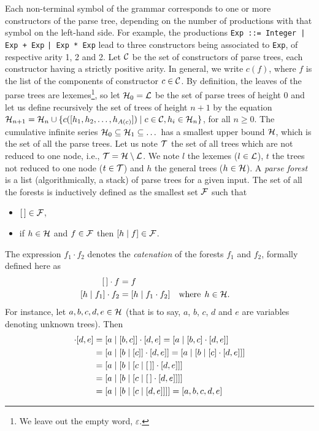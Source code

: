 Each non\hyp{}terminal symbol of the grammar corresponds to one or
more constructors of the parse tree, depending on the number of
productions with that symbol on the left\hyp{}hand side. For example,
the productions \verb/Exp ::= Integer | Exp + Exp/ \verb/| Exp * Exp/
lead to three constructors being associated to \verb|Exp|, of
respective arity 1, 2 and 2. Let \({\cal C}\) be the set of
constructors of parse trees, each constructor having a strictly
positive arity. In general, we write \(c(f)\), where \(f\) is the list
of the components of constructor \(c \in {\cal C}\). By definition,
the leaves of the parse trees are lexemes\footnote{We leave out the
  empty word, \(\varepsilon\).}, so let \({\cal H}_0 = {\cal L}\) be
the set of parse trees of height \(0\) and let us define recursively
the set of trees of height \(n+1\) by the equation \({\cal H}_{n+1} =
{\cal H}_n \cup \{c([h_1, h_2, \dots, h_{A(c)}]) \mid c \in {\cal C},
h_i \in {\cal H}_n\}\), for all \(n \geqslant 0\). The cumulative
infinite series \({\cal H}_0 \subseteq {\cal H}_1 \subseteq \dots\)
has a smallest upper bound \(\cal H\), which is the set of all the
parse trees. Let us note \(\cal T\) the set of all trees which are not
reduced to one node, i.e., \({\cal T} = {\cal H} \setminus {\cal
  L}\). We note \(l\) the lexemes (\(l \in {\cal L}\)), \(t\) the
trees not reduced to one node (\(t \in {\cal T}\)) and \(h\) the
general trees (\(h \in {\cal H}\)). A \emph{parse forest} is a list
(algorithmically, a stack) of parse trees for a given input. The set
of all the forests is inductively defined as the smallest set \(\cal
F\) such that
\begin{itemize}

  \item \([\,] \in {\cal F}\),

  \item if \(h \in {\cal H}\) and \(f \in {\cal F}\) then
    \([{h}\mid{f}] \in {\cal F}\).

\end{itemize}
The expression \(f_1 \cdot f_2\) denotes the \emph{catenation} of the
forests \(f_1\) and \(f_2\), formally defined here as
\begin{align}
  \el \cdot f &= f \label{model:conc:1}\\
  \cons{h}{f_1} \cdot f_2 &= \cons{h}{f_1 \cdot f_2}
  && \text{where} \;\, h \in {\cal H}. \label{model:conc:2}
\end{align}
For instance, let \(a, b, c, d, e \in {\cal H}\) (that is to say,
\(a\), \(b\), \(c\), \(d\) and \(e\) are variables denoting unknown
trees). Then
\begin{align*}
[a,b,c] \cdot [d,e] &= \cons{a}{[b,c]} \cdot [d,e] = \cons{a}{[b,c]
  \cdot [d,e]}\\
 &= \cons{a}{\cons{b}{[c]} \cdot [d,e]} = \cons{a}{\cons{b}{[c] \cdot
    [d,e]}}\\
 &= \cons{a}{\cons{b}{\cons{c}{\el} \cdot [d,e]}}\\
 &= \cons{a}{\cons{b}{\cons{c}{\el \cdot [d,e]}}}\\
 &= \cons{a}{\cons{b}{\cons{c}{[d,e]}}} = [a,b,c,d,e]
\end{align*}

